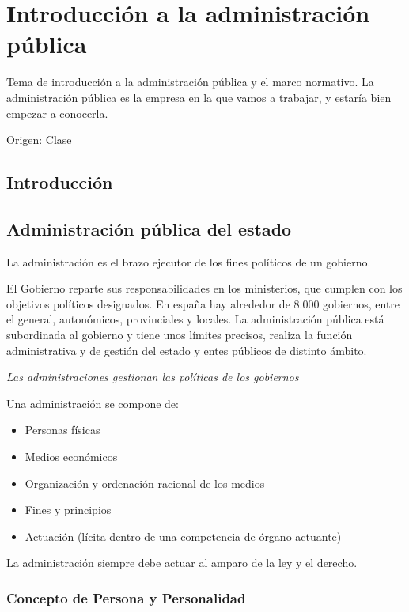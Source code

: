 \setcounter{section}{-1}
\section{Introducción a la administración pública}

Tema de introducción a la administración pública y el marco normativo. La administración pública es la empresa en la que vamos a trabajar, y estaría bien empezar a conocerla.

Origen: Clase

\localtableofcontents

\subsection{Introducción}


\subsection{Administración pública del estado}

    La administración es el brazo ejecutor de los fines políticos de un gobierno.

    El Gobierno reparte sus responsabilidades en los ministerios, que cumplen con los objetivos políticos designados. En españa hay alrededor de 8.000 gobiernos, entre el general, autonómicos, provinciales y locales. La administración pública está subordinada al gobierno y tiene unos límites precisos, realiza la función administrativa y de gestión del estado y entes públicos de distinto ámbito.

    \textit{Las administraciones gestionan las políticas de los gobiernos}

    Una administración se compone de:
    \begin{itemize}
        \item Personas físicas
        \item Medios económicos
        \item Organización y ordenación racional de los medios
        \item Fines y principios
        \item Actuación (lícita dentro de una competencia de órgano actuante)
    \end{itemize}

    La administración siempre debe actuar al amparo de la ley y el derecho.

\subsubsection{Concepto de Persona y Personalidad}

